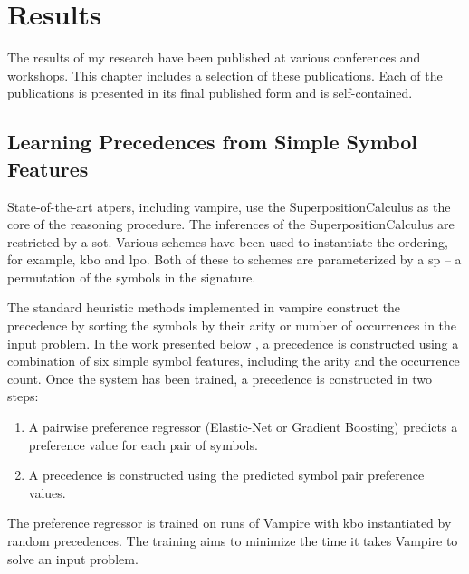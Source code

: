 \newcommand*{\IncludePaper}[2][]{}

\chapter{Results}

The results of my research have been published at various conferences and workshops.
This chapter includes a selection of these publications.
Each of the publications is presented in its final published form and is self-contained.


\section{Learning Precedences from Simple Symbol Features}
\label{sec:results:simple}

State-of-the-art \glspl{atper}, including \gls{vampire}, use the \gls{SuperpositionCalculus} as the core of the reasoning procedure.
The inferences of the \gls{SuperpositionCalculus} are restricted by a \gls{sot}.
Various schemes have been used to instantiate the ordering,
for example,
\gls{kbo} and \gls{lpo}.
Both of these \gls{to} schemes are parameterized by a \gls{sp} -- a permutation of the symbols in the signature.

The standard heuristic methods implemented in \gls{vampire} construct the \gls{precedence} by sorting the symbols by their arity or number of occurrences in the input problem.
In the work presented below \cite{DBLP:conf/cade/Bartek020},
a \gls{precedence} is constructed using a combination of six simple symbol features,
including the arity and the occurrence count.
Once the system has been trained,
a precedence is constructed in two steps:
\begin{enumerate}
\item A pairwise preference regressor (Elastic-Net or Gradient Boosting) predicts a preference value for each pair of symbols.
\item A precedence is constructed using the predicted symbol pair preference values.
\end{enumerate}
The preference regressor is trained on runs of Vampire with \gls{kbo} instantiated by random precedences.
The training aims to minimize the time it takes Vampire to solve an input problem.

